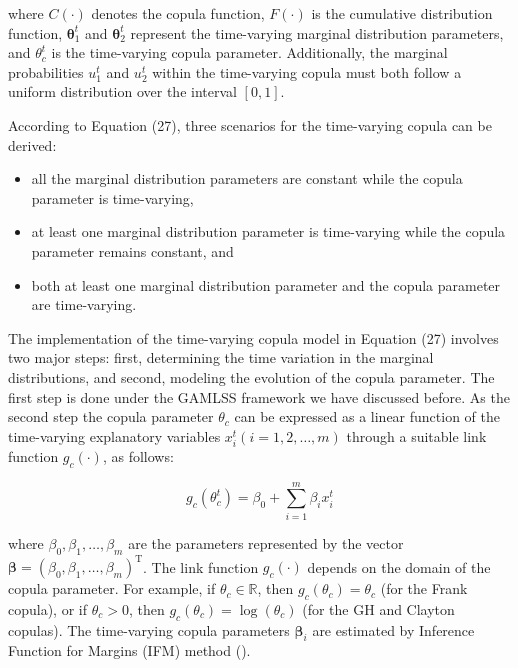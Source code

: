 \documentclass[
]{krantz}
\begin{document}
where \(C(\cdot)\) denotes the copula function, \(F(\cdot)\) is the cumulative distribution function, \(\boldsymbol{\theta}_{1}^{t}\) and \(\boldsymbol{\theta}_{2}^{t}\) represent the time-varying marginal distribution parameters, and \(\theta_{c}^{t}\) is the time-varying copula parameter. Additionally, the marginal probabilities \(u_{1}^{t}\) and \(u_{2}^{t}\) within the time-varying copula must both follow a uniform distribution over the interval \([0,1]\).

According to Equation (27), three scenarios for the time-varying copula can be derived:

\begin{itemize}
\item
  all the marginal distribution parameters are constant while the copula parameter is time-varying,
\item
  at least one marginal distribution parameter is time-varying while the copula parameter remains constant, and
\item
  both at least one marginal distribution parameter and the copula parameter are time-varying.
\end{itemize}

The implementation of the time-varying copula model in Equation (27) involves two major steps: first, determining the time variation in the marginal distributions, and second, modeling the evolution of the copula parameter. The first step is done under the GAMLSS framework we have discussed before. As the second step the copula parameter \(\theta_{c}\) can be expressed as a linear function of the time-varying explanatory variables \(x_{i}^{t} (i=1,2, \ldots, m)\) through a suitable link function \(g_{c}(\cdot)\), as follows:

\[
g_{c}\left(\theta_{c}^{t}\right) = \beta_{0} + \sum_{i=1}^{m} \beta_{i} x_{i}^{t} \tag{27}
\]

where \(\beta_{0}, \beta_{1}, \ldots, \beta_{m}\) are the parameters represented by the vector \(\boldsymbol{\beta} = \left(\beta_{0}, \beta_{1}, \ldots, \beta_{m}\right)^{\mathrm{T}}\). The link function \(g_{c}(\cdot)\) depends on the domain of the copula parameter. For example, if \(\theta_{c} \in \mathbb{R}\), then \(g_{c}(\theta_{c}) = \theta_{c}\) (for the Frank copula), or if \(\theta_{c} > 0\), then \(g_{c}(\theta_{c}) = \log(\theta_{c})\) (for the GH and Clayton copulas). The time-varying copula parameters \(\boldsymbol{\beta}_{i}\) are estimated by Inference Function for Margins (IFM) method (\citet{Joe1997}).
\end{document}
